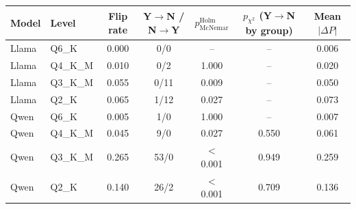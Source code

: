 \begin{tabular}{llccccc}
\toprule
Model & Level & Flip rate & Y$\to$N / N$\to$Y & $p_{\mathrm{McNemar}}^{\mathrm{Holm}}$ & $p_{\chi^2}$ (Y$\to$N by group) & Mean $|\Delta P|$ \\
\midrule
Llama & Q6\_K & 0.000 & 0/0 & -- & -- & 0.006 \\
Llama & Q4\_K\_M & 0.010 & 0/2 & 1.000 & -- & 0.020 \\
Llama & Q3\_K\_M & 0.055 & 0/11 & 0.009 & -- & 0.050 \\
Llama & Q2\_K & 0.065 & 1/12 & 0.027 & -- & 0.073 \\
Qwen & Q6\_K & 0.005 & 1/0 & 1.000 & -- & 0.007 \\
Qwen & Q4\_K\_M & 0.045 & 9/0 & 0.027 & 0.550 & 0.061 \\
Qwen & Q3\_K\_M & 0.265 & 53/0 & $<$0.001 & 0.949 & 0.259 \\
Qwen & Q2\_K & 0.140 & 26/2 & $<$0.001 & 0.709 & 0.136 \\
\bottomrule
\end{tabular}
